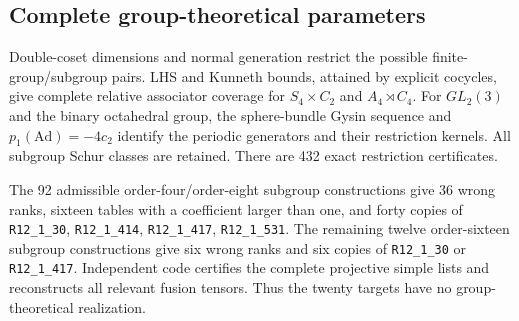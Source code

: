 \documentclass[11pt]{article}
\newcommand{\R}[1]{\texttt{R12\_1\_#1}}
\begin{document}
\subsection{Complete group-theoretical parameters}
Double-coset dimensions and normal generation restrict the possible
finite-group/subgroup pairs. LHS and Kunneth bounds, attained by explicit
cocycles, give complete relative associator coverage for $S_4\times C_2$
and $A_4\rtimes C_4$. For $GL_2(3)$ and the binary octahedral group, the
sphere-bundle Gysin sequence and $p_1(\mathrm{Ad})=-4c_2$ identify the
periodic generators and their restriction kernels. All subgroup Schur
classes are retained. There are 432 exact restriction certificates.

The 92 admissible order-four/order-eight subgroup constructions give
36 wrong ranks, sixteen tables with a coefficient larger than one, and
forty copies of \R{30}, \R{414}, \R{417}, \R{531}. The remaining twelve
order-sixteen subgroup constructions give six wrong ranks and six copies
of \R{30} or \R{417}. Independent code certifies the complete projective
simple lists and reconstructs all relevant fusion tensors. Thus the twenty
targets have no group-theoretical realization.
\end{document}
